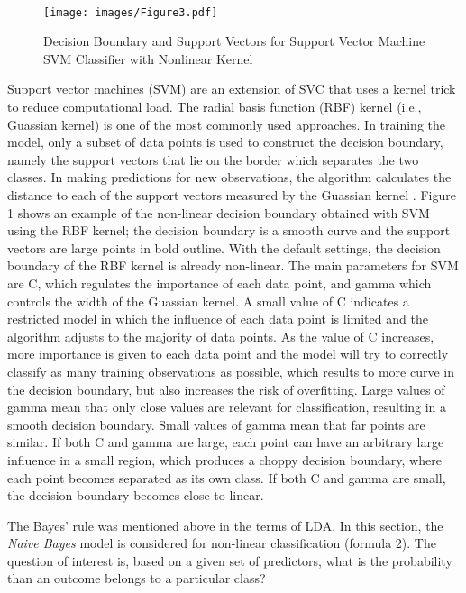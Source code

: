 \\\documentclass[sigconf]{acmart}
\begin{document}
\begin{figure}[!ht]
  \centering\texttt{[image: images/Figure3.pdf]}
  \caption{Decision Boundary and Support Vectors for Support Vector Machine 
  SVM Classifier with Nonlinear Kernel \cite{muller17}}
  \label{f:Figure3}
\end{figure}

Support vector machines (SVM) are an extension of SVC that uses a kernel trick 
to reduce computational load. The radial basis function (RBF) kernel (i.e., 
Guassian kernel) is one of the most commonly used approaches. In training 
the model, only a subset of data points is used to construct the decision 
boundary, namely the support vectors that lie on the border which separates 
the two classes. In making predictions for new observations, the algorithm 
calculates the distance to each of the support vectors measured by the 
Guassian kernel \cite{muller17}. Figure 1 shows an example of the non-linear 
decision boundary obtained with SVM using the RBF kernel; the decision boundary 
is a smooth curve and the support vectors are large points in bold outline. 
With the default settings, the decision boundary of the RBF kernel is already 
non-linear. The main parameters for SVM are C, which regulates the importance 
of each data point, and gamma which controls the width of the Guassian kernel. 
A small value of C indicates a restricted model in which the influence of each 
data point is limited and the algorithm adjusts to the majority of data points. 
As the value of C increases, more importance is given to each data point and
the model will try to correctly classify as many training observations as 
possible, which results to more curve in the decision boundary, but also
increases the risk of overfitting. Large values of gamma mean that only close 
values are relevant for classification, resulting in a smooth decision boundary. 
Small values of gamma mean that far points are similar. If both C and gamma are
large, each point can have an arbitrary large influence in a small region, 
which produces a choppy decision boundary, where each point becomes separated
as its own class. If both C and gamma are small, the decision boundary becomes 
close to linear.


The Bayes' rule was mentioned above in the terms of LDA. In this section, 
the \emph{Naive Bayes} model is considered for non-linear classification
(formula 2). The question of interest is, based on a given set of predictors, 
what is the probability than an outcome belongs to a particular class?
\end{document}
